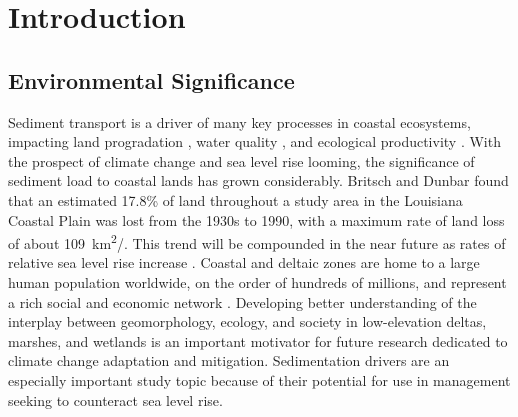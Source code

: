 \documentclass[geosciences,article,submit,moreauthors,pdftex]{Definitions/mdpi}
\begin{document}
\section{Introduction}

\subsection{Environmental Significance}

Sediment transport is a driver of many key processes in coastal ecosystems, impacting land progradation \cite{kenyon1985morphology}, water quality \cite{goodwin2003temporal}, and ecological productivity \cite{kirwan2007coupled}. With the prospect of climate change and sea level
rise looming, the significance of sediment load to coastal lands has grown considerably. Britsch
and Dunbar \cite{britsch1993land} found that an estimated 17.8\% of land throughout a study area in the Louisiana Coastal
Plain was lost from the 1930s to 1990, with a maximum rate of land loss of about \SI{109}{\kilo\metre\squared/\year}. This trend will be compounded in the near future as rates of relative sea level
rise increase \cite{fitzgerald2008coastal}. Coastal and
deltaic zones are home to a large human population worldwide, on the order of hundreds of millions, and represent a rich social and economic network \cite{syvitski2009sinking}. Developing better understanding of the interplay between geomorphology, ecology, and society in low-elevation deltas, marshes, and wetlands \cite{langley2009elevated, silliman2012degradation, ma2018ecogeomorphic} is an important motivator for future research dedicated to climate change adaptation and mitigation. Sedimentation drivers are an especially important study topic because of their potential for use in management seeking to counteract sea level rise.
\end{document}
